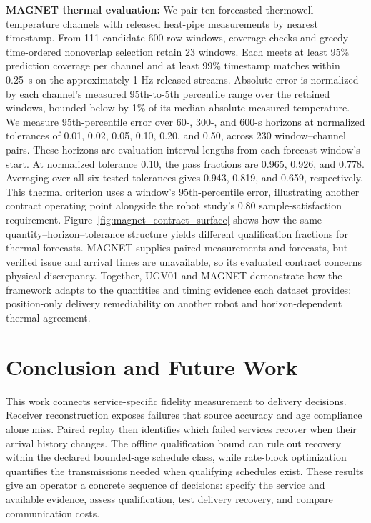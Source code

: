 \documentclass[journal]{IEEEtran}
\newcommand{\rev}[1]{#1}
\newcommand{\revision}[1]{#1}
\begin{document}
\noindent\textbf{MAGNET thermal evaluation:} We pair ten forecasted
thermowell-temperature channels with released heat-pipe measurements
\cite{wilsdon2023magnet} by nearest timestamp. From 111 candidate
600-row windows, \rev{coverage checks and greedy time-ordered
nonoverlap selection retain 23 windows. Each meets at least 95\%
prediction coverage per channel and at least 99\% timestamp matches
within 0.25~s on the approximately 1-Hz released streams.}
Absolute error is normalized by each channel's measured
95th-to-5th percentile range over the retained windows, \rev{bounded below
by 1\% of its median absolute measured temperature.} We measure 95th-percentile error over 60-, 300-, and 600-s
horizons at normalized tolerances of 0.01, 0.02, 0.05, 0.10, 0.20, and
0.50, across 230
window--channel pairs. \rev{These horizons are evaluation-interval
lengths from each forecast window's start. At normalized tolerance 0.10,
the pass fractions are 0.965, 0.926, and 0.778. Averaging over all six
tested tolerances gives 0.943, 0.819, and 0.659, respectively. This
thermal criterion uses a window's 95th-percentile error, illustrating
another contract operating point alongside the robot study's 0.80
sample-satisfaction requirement.}
\revision{Figure~\ref{fig:magnet_contract_surface} shows how the same
quantity--horizon--tolerance structure yields different qualification
fractions for thermal forecasts. MAGNET supplies paired measurements and
forecasts, but verified issue and arrival times are unavailable, so its
evaluated contract concerns physical discrepancy. Together, UGV01 and
MAGNET demonstrate how the framework adapts to the quantities and timing
evidence each dataset provides: position-only delivery remediability on
another robot and horizon-dependent thermal agreement.}

\section{Conclusion and Future Work}
\label{sec:conclusion}

\revision{This work connects service-specific fidelity measurement to
delivery decisions. Receiver reconstruction exposes failures that source
accuracy and age compliance alone miss. Paired replay then identifies
which failed services recover when their arrival history changes. The
offline qualification bound can rule out recovery within the declared
bounded-age schedule class, while rate-block optimization quantifies the
transmissions needed when qualifying schedules exist. These results give
an operator a concrete sequence of decisions: specify the service and
available evidence, assess qualification, test delivery recovery, and
compare communication costs.}
\end{document}
